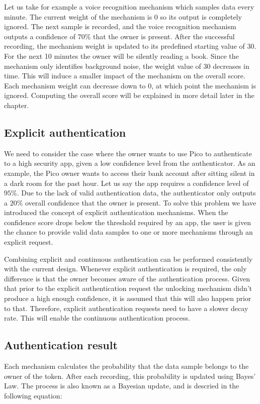 Let us take for example a voice recognition mechanism which samples data every minute. The current weight of the mechanism is 0 so its output is completely ignored. The next sample is recorded, and the voice recognition mechanism outputs a confidence of $70\%$ that the owner is present. After the successful recording, the mechanism weight is updated to its predefined starting value of 30. For the next 10 minutes the owner will be silently reading a book. Since the mechanism only identifies background noise, the weight value of 30 decreases in time. This will induce a smaller impact of the mechanism on the overall score. Each mechanism weight can decrease down to 0, at which point the mechanism is ignored. Computing the overall score will be explained in more detail later in the chapter.

\subsection{Explicit authentication}
We need to consider the case where the owner wants to use Pico to authenticate to a high security app, given a low confidence level from the authenticator. As an example, the Pico owner wants to access their bank account after sitting silent in a dark room for the past hour. Let us say the app requires a confidence level of $95\%$. Due to the lack of valid authentication data, the authenticator only outputs a $20\%$ overall confidence that the owner is present. To solve this problem we have introduced the concept of explicit authentication mechanisms. When the confidence score drops below the threshold required by an app, the user is given the chance to provide valid data samples to one or more mechanisms through an explicit request.

Combining explicit and continuous authentication can be performed consistently with the current design. Whenever explicit authentication is required, the only difference is that the owner becomes aware of the authentication process. Given that prior to the explicit authentication request the unlocking mechanism didn't produce a high enough confidence, it is assumed that this will also happen prior to that. Therefore, explicit authentication requests need to have a slower decay rate. This will enable the continuous authentication process.

\subsection*{Authentication result}
\label{authfeedback}
Each mechanism calculates the probability that the data sample belongs to the owner of the token. After each recording, this probability is updated using Bayes' Law. The process is also known as a Bayesian update, and is descried in the following equation:

